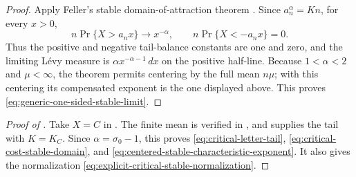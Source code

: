 \begin{proof}
Apply Feller's stable domain-of-attraction theorem
\cite[Ch.~XVII, Sec.~5, Thm.~2]{Feller1971}.  Since
\(a_n^\alpha=Kn\), for every \(x>0\),
\begin{equation}
 n\Pr\{X>a_nx\}\longrightarrow x^{-\alpha},
 \qquad
 n\Pr\{X<-a_nx\}=0.
 \label{eq:stable-tail-balance}
\end{equation}
Thus the positive and negative tail-balance constants are one and zero,
and the limiting L\'evy measure is
\(\alpha x^{-\alpha-1}\,dx\) on the positive half-line.  Because
\(1<\alpha<2\) and \(\mu<\infty\), the theorem permits centering by the
full mean \(n\mu\); with this centering its compensated exponent is the one
displayed above.  This proves \eqref{eq:generic-one-sided-stable-limit}.
\end{proof}

\begin{proof}[Proof of ]
Take \(X=C\) in .  The finite mean is
verified in , and
 supplies the tail with \(K=K_C\).
Since \(\alpha=\sigma_0-1\), this proves
\eqref{eq:critical-letter-tail}, \eqref{eq:critical-cost-stable-domain}, and
\eqref{eq:centered-stable-characteristic-exponent}.  It also gives the
normalization \eqref{eq:explicit-critical-stable-normalization}.
\end{proof}

